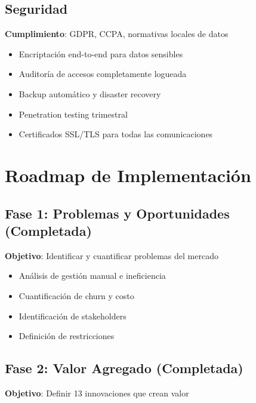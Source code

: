 \documentclass[11pt,a4paper]{article}
\begin{document}
\begin{itemize}
\subsection{Seguridad}

\begin{alerta}
\textbf{Cumplimiento}: GDPR, CCPA, normativas locales de datos
\end{alerta}

\begin{itemize}
    \item Encriptación end-to-end para datos sensibles
    \item Auditoría de accesos completamente logueada
    \item Backup automático y disaster recovery
    \item Penetration testing trimestral
    \item Certificados SSL/TLS para todas las comunicaciones
\end{itemize}

\section{Roadmap de Implementación}

\subsection{Fase 1: Problemas y Oportunidades (Completada)}

\textbf{Objetivo}: Identificar y cuantificar problemas del mercado

\begin{itemize}
    \item Análisis de gestión manual e ineficiencia
    \item Cuantificación de churn y costo
    \item Identificación de stakeholders
    \item Definición de restricciones
\end{itemize}

\subsection{Fase 2: Valor Agregado (Completada)}

\textbf{Objetivo}: Definir 13 innovaciones que crean valor


\end{itemize}
\end{document}

